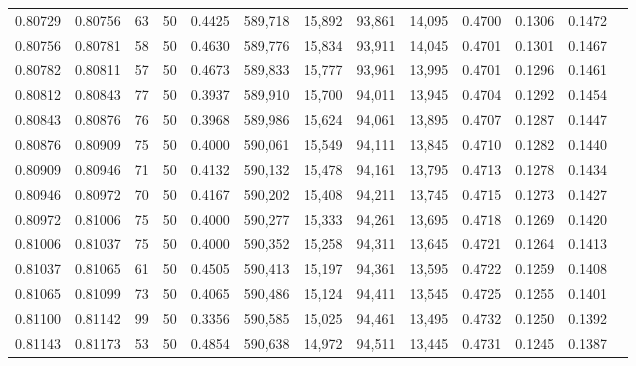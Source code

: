 \begin{tabular}{rrrrrrrrrrrrr}
0.80729 & 0.80756 &    63 &  50 &                                     0.4425 & 589,718 &  15,892 &  93,861 &  14,095 & 0.4700 & 0.1306 & 0.1472 \\
0.80756 & 0.80781 &    58 &  50 &                                     0.4630 & 589,776 &  15,834 &  93,911 &  14,045 & 0.4701 & 0.1301 & 0.1467 \\
0.80782 & 0.80811 &    57 &  50 &                                     0.4673 & 589,833 &  15,777 &  93,961 &  13,995 & 0.4701 & 0.1296 & 0.1461 \\
0.80812 & 0.80843 &    77 &  50 &                                     0.3937 & 589,910 &  15,700 &  94,011 &  13,945 & 0.4704 & 0.1292 & 0.1454 \\
0.80843 & 0.80876 &    76 &  50 &                                     0.3968 & 589,986 &  15,624 &  94,061 &  13,895 & 0.4707 & 0.1287 & 0.1447 \\
0.80876 & 0.80909 &    75 &  50 &                                     0.4000 & 590,061 &  15,549 &  94,111 &  13,845 & 0.4710 & 0.1282 & 0.1440 \\
0.80909 & 0.80946 &    71 &  50 &                                     0.4132 & 590,132 &  15,478 &  94,161 &  13,795 & 0.4713 & 0.1278 & 0.1434 \\
0.80946 & 0.80972 &    70 &  50 &                                     0.4167 & 590,202 &  15,408 &  94,211 &  13,745 & 0.4715 & 0.1273 & 0.1427 \\
0.80972 & 0.81006 &    75 &  50 &                                     0.4000 & 590,277 &  15,333 &  94,261 &  13,695 & 0.4718 & 0.1269 & 0.1420 \\
0.81006 & 0.81037 &    75 &  50 &                                     0.4000 & 590,352 &  15,258 &  94,311 &  13,645 & 0.4721 & 0.1264 & 0.1413 \\
0.81037 & 0.81065 &    61 &  50 &                                     0.4505 & 590,413 &  15,197 &  94,361 &  13,595 & 0.4722 & 0.1259 & 0.1408 \\
0.81065 & 0.81099 &    73 &  50 &                                     0.4065 & 590,486 &  15,124 &  94,411 &  13,545 & 0.4725 & 0.1255 & 0.1401 \\
0.81100 & 0.81142 &    99 &  50 &                                     0.3356 & 590,585 &  15,025 &  94,461 &  13,495 & 0.4732 & 0.1250 & 0.1392 \\
0.81143 & 0.81173 &    53 &  50 &                                     0.4854 & 590,638 &  14,972 &  94,511 &  13,445 & 0.4731 & 0.1245 & 0.1387 \\

\end{tabular}
